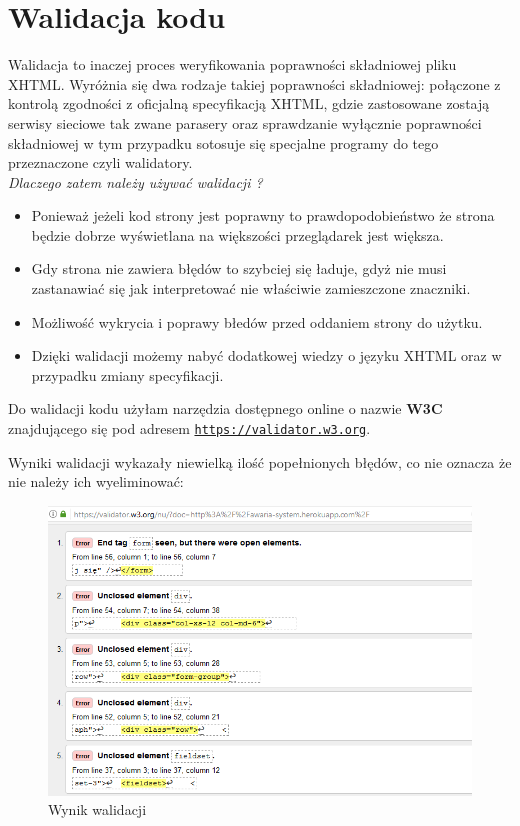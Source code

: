 \documentclass[openright]{xmgr}
\begin{document}
	
	\section{Walidacja kodu}
	
	Walidacja to inaczej proces weryfikowania poprawności składniowej pliku XHTML. Wyróżnia się dwa rodzaje takiej poprawności składniowej: połączone z kontrolą zgodności z oficjalną specyfikacją XHTML, gdzie zastosowane zostają serwisy sieciowe tak zwane parasery oraz sprawdzanie wyłącznie poprawności składniowej w tym przypadku sotosuje się specjalne programy do tego przeznaczone czyli walidatory.\\
	
	\textit{Dlaczego zatem należy używać walidacji ?}
		\begin{itemize}
			\item Ponieważ jeżeli kod strony jest poprawny to prawdopodobieństwo że strona będzie dobrze wyświetlana na większości przeglądarek jest większa.
			\item Gdy strona nie zawiera błędów to szybciej się ładuje, gdyż nie musi zastanawiać się jak interpretować nie właściwie zamieszczone znaczniki.
			\item Możliwość wykrycia i poprawy błedów przed oddaniem strony do użytku.
			\item Dzięki walidacji możemy nabyć dodatkowej wiedzy o języku XHTML oraz w przypadku zmiany specyfikacji.
		\end{itemize}
		
		Do walidacji kodu użyłam narzędzia dostępnego online o nazwie \textbf{W3C} znajdującego się pod adresem \texttt{\url{https://validator.w3.org}}.
	
	Wyniki walidacji wykazały niewielką ilość popełnionych błędów, co nie oznacza że nie należy ich wyeliminować:
	
	\begin{figure}[!tbh]
		\centering
		\includegraphics[width=\linewidth]{image/walidacja}
		\caption{Wynik walidacji}
	\end{figure}
	
\end{document}
